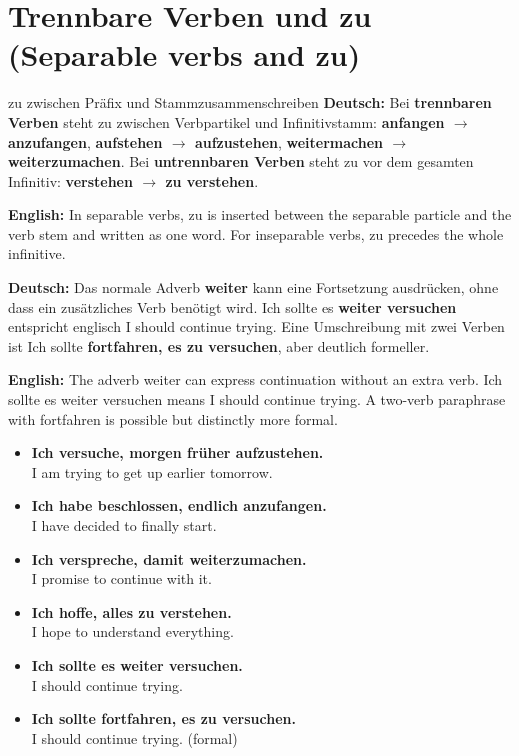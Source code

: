 \documentclass[a4paper,11pt]{article}
\newcommand{\GermanText}[1]{\textbf{Deutsch: }#1\par}
\newcommand{\EnglishText}[1]{{\small\color{SoftGray}\textbf{English: }#1\par}}
\newcommand{\ExampleItem}[2]{\item \textbf{#1}\\{\small\color{SoftGray}#2}}
\newcommand{\DEEN}[2]{\GermanText{#1}\EnglishText{#2}}
\newcommand{\Pair}[2]{\ExampleItem{#1}{#2}}
\begin{document}
\section{Trennbare Verben und zu \textnormal{(Separable verbs and zu)}}
\begin{grammarentry}{zu zwischen Präfix und Stamm}{zusammenschreiben}
\DEEN{Bei \textbf{trennbaren Verben} steht zu zwischen Verbpartikel und Infinitivstamm: \textbf{anfangen $\rightarrow$ anzufangen}, \textbf{aufstehen $\rightarrow$ aufzustehen}, \textbf{weitermachen $\rightarrow$ weiterzumachen}. Bei \textbf{untrennbaren Verben} steht zu vor dem gesamten Infinitiv: \textbf{verstehen $\rightarrow$ zu verstehen}.}{In separable verbs, zu is inserted between the separable particle and the verb stem and written as one word. For inseparable verbs, zu precedes the whole infinitive.}
\DEEN{Das normale Adverb \textbf{weiter} kann eine Fortsetzung ausdrücken, ohne dass ein zusätzliches Verb benötigt wird. \glqq Ich sollte es \textbf{weiter versuchen}\grqq{} entspricht englisch \glqq I should continue trying\grqq. Eine Umschreibung mit zwei Verben ist \glqq Ich sollte \textbf{fortfahren, es zu versuchen}\grqq, aber deutlich formeller.}{The adverb weiter can express continuation without an extra verb. Ich sollte es weiter versuchen means I should continue trying. A two-verb paraphrase with fortfahren is possible but distinctly more formal.}
\end{grammarentry}
\begin{exbox}\begin{itemize}
\Pair{Ich versuche, morgen früher aufzustehen.}{I am trying to get up earlier tomorrow.}
\Pair{Ich habe beschlossen, endlich anzufangen.}{I have decided to finally start.}
\Pair{Ich verspreche, damit weiterzumachen.}{I promise to continue with it.}
\Pair{Ich hoffe, alles zu verstehen.}{I hope to understand everything.}
\Pair{Ich sollte es weiter versuchen.}{I should continue trying.}
\Pair{Ich sollte fortfahren, es zu versuchen.}{I should continue trying. (formal)}
\end{itemize}\end{exbox}
\end{document}
